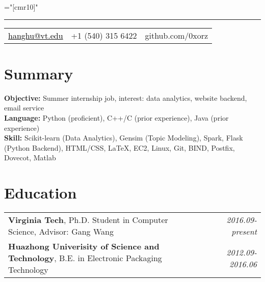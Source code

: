 \documentclass[a4paper,10pt]{article}
\begin{document}
\pagestyle{empty} %

\font\fb="[cmr10]" %
\bigskip

\hrule height 0.7mm \vspace{-0.4em}
\begin{tabular}{p{4.0cm}p{4.0cm}p{4.0cm}}
{\small \href{mailto:hanghu@vt.edu}{\textcolor{black}{hanghu@vt.edu}}}
&{\small +1 (540) 315 6422}
&{\small github.com/0xorz}
   \\
\end{tabular}
\section{Summary}
\begin{flushleft}
\hspace{1em} \textbf{Objective:} Summer internship job, interest: data analytics, website backend, email service \\
\hspace{1em} \textbf{Language:} Python (proficient), C++/C (prior experience), Java (prior experience) \\
\hspace{1em} \textbf{Skill:} Scikit-learn (Data Analytics), Gensim (Topic Modeling), Spark, Flask (Python Backend), HTML/CSS, \LaTeX, EC2, Linux, Git, BIND, Postfix, Dovecot, Matlab\\
\end{flushleft}

\section{Education}
\begin{tabular}{p{14cm}p{0cm}r}
\textbf{Virginia Tech}, Ph.D. Student in Computer Science, Advisor: Gang Wang && \emph{2016.09-present} \\
\textbf{Huazhong Univerisity of Science and Technology}, B.E. in Electronic Packaging Technology && \emph{2012.09-2016.06} \\
\end{tabular}
\end{document}
